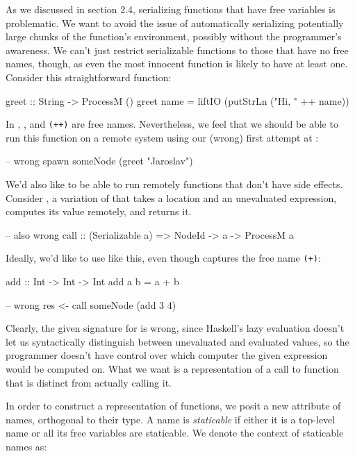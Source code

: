 \documentclass[preprint]{sigplanconf}
\begin{document}
As we discussed in section 2.4, serializing functions that have free variables is problematic. We want to avoid the issue of automatically serializing potentially large chunks of the function's environment, possibly without the programmer's awareness. We can't just restrict serializable functions to those that have no free names, though, as even the most innocent function is likely to have at least one. Consider this straightforward function:

\begin{code}
greet :: String -> ProcessM ()
greet name = liftIO (putStrLn ("Hi, " ++ name))
\end{code}

In , ,  and \lstinline!(++)! are free names. Nevertheless, we feel that we should be able to run this function on a remote system using our (wrong) first attempt at :

\begin{code}
-- wrong
spawn someNode (greet "Jaroslav")
\end{code}

We'd also like to be able to run remotely functions that don't have side effects. Consider , a variation of  that takes a location and an unevaluated expression, computes its value remotely, and returns it.

\begin{code}
-- also wrong
call :: (Serializable a) => NodeId -> a -> ProcessM a
\end{code}

Ideally, we'd like to use  like this, even though  captures the free name \lstinline!(+)!:

\begin{code}
add :: Int -> Int -> Int
add a b = a + b

-- wrong
res <- call someNode (add 3 4)
\end{code}

Clearly, the given signature for  is wrong, since Haskell's lazy evaluation doesn't let us syntactically distinguish between  unevaluated and evaluated values, so the programmer doesn't have control over which computer the given expression would be computed on. What we want is a representation of a call to  function that is distinct from actually calling it.

In order to construct a representation of functions, we posit a new attribute of names, orthogonal to their type. A name is {\em staticable} if either it is a top-level name or all its free variables are staticable. We denote the context of staticable names as:
\end{document}
